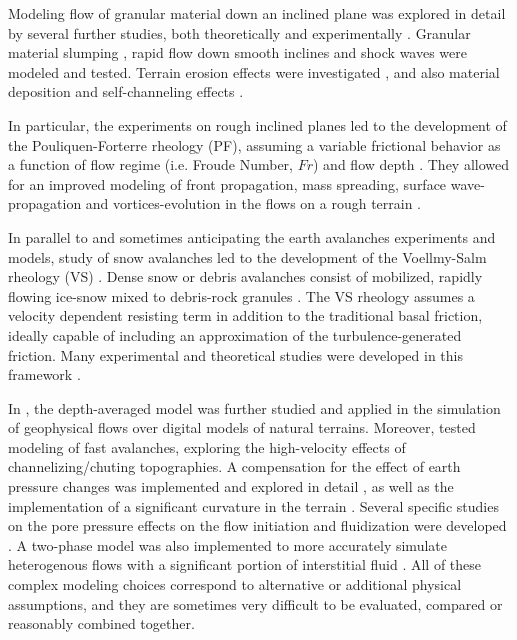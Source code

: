 \documentclass{article}
\begin{document}
Modeling flow of granular material down an inclined plane was explored in detail by several further studies, both theoretically and experimentally \citep{Pouliquen1999, RuyerQuil2000, Silbert2001, Bursik2005, DaCruz2005}. Granular material slumping \citep{Balmforth2005,Lajeunesse2005}, rapid flow down smooth inclines \citep{Greve1994,Wieland1999} and shock waves \citep{Gray2003,Hokanardottir2005} were modeled and tested. Terrain erosion effects were investigated \citep{Pitman2003b, Edwards2015}, and also material deposition and self-channeling effects \citep{Mangeney2005, Mangeney2007}.

In particular, the experiments on rough inclined planes led to the development of the Pouliquen-Forterre rheology (PF), assuming a variable frictional behavior as a function of flow regime (i.e. Froude Number, $Fr$) and flow depth \citep{Pouliquen1999, ForterrePouliquen2002, PouliquenForterre2002, ForterrePouliquen2003}. They allowed for an improved modeling of front propagation, mass spreading, surface wave-propagation and vortices-evolution in the flows on a rough terrain \citep{Forterre2006, Jop2006, ForterrePouliquen2008}.

In parallel to and sometimes anticipating the earth avalanches experiments and models, study of snow avalanches led to the development of the Voellmy-Salm rheology (VS) \citep{Voellmy1955, Salm1990, Salm1993, Bartelt1999}. Dense snow or debris avalanches consist of mobilized, rapidly flowing ice-snow mixed to debris-rock granules \citep{BarteltMcArdell2009}. The VS rheology assumes a velocity dependent resisting term in addition to the traditional basal friction, ideally capable of including an approximation of the turbulence-generated friction. Many experimental and theoretical studies were developed in this framework \citep{Gruber2007, Kern2009, Christen2010, Fischer2012}.

In \cite{Iverson1997, Iverson2001, Denlinger2001, Denlinger2004, Iverson2004}, the depth-averaged model was further studied and applied in the simulation of geophysical flows over digital models of natural terrains. Moreover, \cite{Gray1999, Gray2003} tested modeling of fast avalanches, exploring the high-velocity effects of channelizing/chuting topographies. A compensation for the effect of earth pressure changes was implemented and explored in detail \citep{Pirulli2007,Pirulli2008}, as well as the implementation of a significant curvature in the terrain \citep{PudasainiHutter2003, Fischer2012}. Several specific studies on the pore pressure effects on the flow initiation and fluidization were developed \citep{SavageIverson2003, Iordanoff2004, Iverson2014}. A two-phase model was also implemented to more accurately simulate heterogenous flows with a significant portion of interstitial fluid \citep{PitmanLe2005}. All of these complex modeling choices correspond to alternative or additional physical assumptions, and they are sometimes very difficult to be evaluated, compared or reasonably combined together.
\end{document}
